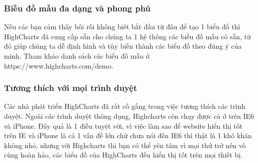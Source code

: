 \subsubsection{Biễu đồ mẫu đa dạng và phong phú}
Nếu các bạn cảm thấy bối rối không biết bắt đầu từ đâu để tạo 1 biểu đồ thì HighCharts đã cung cấp sẵn cho chúng ta 1 hệ thống các biễu đồ mẫu có sẵn, từ đó giúp chúng ta dễ định hình và tùy biến thành các biểu đồ theo đúng ý của mình. Tham khảo danh sách các biểu đồ mẫu ở https://www.highcharts.com/demo.

\subsubsection{Tương thích với mọi trình duyệt}
Các nhà phát triển HighCharts đã rất cố gắng trong việc tương thích các trình duyệt. Ngoài các trình duyệt thông dụng, Highcharts còn chạy được cả ở trên IE6 và iPhone. Đây quả là 1 điều tuyệt vời, vì việc làm sao để website hiển thị tốt trên IE và iPhone là cả 1 vấn đề lớn chứ chưa nói đến IE6 thì thật là 1 khó khăn không nhỏ, nhưng với Highcharts thì bạn có thể yên tâm vì mọi thứ trở nên vô cùng hoàn hảo, các biểu đồ của HighCharts đều hiển thị tốt trên mọi thiết bị.
